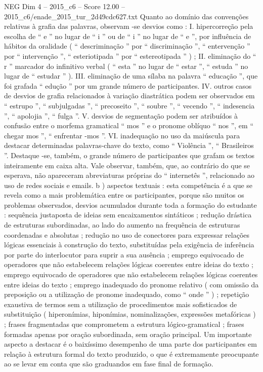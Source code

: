 \begin{textsample}{NEG Dim 4 – 2015\_c6 – Score 12.00 – 2015\_c6/enade\_2015\_tur\_2d49cdc627.txt}
Quanto ao domínio das convenções relativas à grafia das palavras, observam -se desvios como : I. hipercorreção pela escolha de “ e ” no lugar de “ i ” ou de “ i ” no lugar de “ e ”, por influência de hábitos da oralidade ( “ descriminação ” por “ discriminação ”, “ entervenção ” por “ intervenção ”, “ esteriotipada ” por “ estereotipada ” ) ; II. eliminação do “ r ” marcador do infinitivo verbal ( “ esta ” no lugar de “ estar ”, “ estuda ” no lugar de “ estudar ” ).
III. eliminação de uma sílaba na palavra “ educação ”, que foi grafada “ edução ” por um grande número de participantes.
IV. outros casos de desvios de grafia relacionados à variação diastrática podem ser observados em “ estrupo ”, “ subjulgadas ”, “ precoseito ”, “ soubre ”, “ vecendo ”, “ indesencia ”, “ apolojia ”, “ fulga ”.
V. desvios de segmentação podem ser atribuídos à confusão entre o morfema gramatical “ mos ” e o pronome oblíquo “ nos ”, em “ chegar mos ”, “ enfrentar -mos ”.
VI. inadequação no uso da maiúscula para destacar determinadas palavras-chave do texto, como “ Violência ”, “ Brasileiros ”.
Destaque -se, também, o grande número de participantes que grafam os textos inteiramente em caixa alta.
Vale observar, também, que, ao contrário do que se esperava, não apareceram abreviaturas próprias do “ internetês ”, relacionado ao uso de redes sociais e emails. b ) aspectos textuais : esta competência é a que se revela como a mais problemática entre os participantes, porque são muitos os problemas observados, desvios acumulados durante toda a formação do estudante : sequência justaposta de ideias sem encaixamentos sintáticos ; redução drástica de estruturas subordinadas, ao lado do aumento na frequência de estruturas coordenadas e absolutas ; redução no uso de conectores para expressar relações lógicas essenciais à construção do texto, substituídas pela exigência de inferência por parte do interlocutor para suprir a sua ausência ; emprego equivocado de operadores que não estabelecem relações lógicas coerentes entre ideias do texto ; emprego equivocado de operadores que não estabelecem relações lógicas coerentes entre ideias do texto ; emprego inadequado do pronome relativo ( com omissão da preposição ou a utilização de pronome inadequado, como “ onde ” ) ; repetição exaustiva de termos sem a utilização de procedimentos mais sofisticados de substituição ( hiperonímias, hiponímias, nominalizações, expressões metafóricas ) ; frases fragmentadas que comprometem a estrutura lógico-gramatical ; frases formadas apenas por oração subordinada, sem oração principal.
Um importante aspecto a destacar é o baixíssimo desempenho de uma parte dos participantes em relação à estrutura formal do texto produzido, o que é extremamente preocupante ao se levar em conta que são graduandos em fase final de formação.

\end{textsample}
